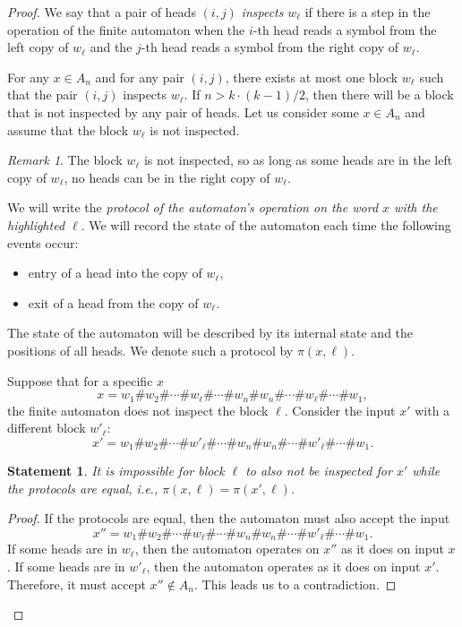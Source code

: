 \documentclass[12pt,sans]{article}
\theoremstyle{definition}
\theoremstyle{plain}
\newtheorem{statement}{Statement}[section]
\theoremstyle{remark}
\newtheorem{remark}{Remark}[section]
\begin{document}
\begin{proof}
    We say that a pair of heads $(i,j)$ \emph{inspects} $w_\ell$ if there is a step in the operation of the finite automaton when the $i$-th head reads a symbol from the left copy of $w_\ell$ and the $j$-th head reads a symbol from the right copy of $w_\ell$.

    For any $x \in A_n$ and for any pair $(i,j)$, there exists at most one block $w_\ell$ such that the pair $(i,j)$ inspects $w_\ell$. If $n > k \cdot (k-1)/2$, then there will be a block that is not inspected by any pair of heads. Let us consider some $x \in A_n$ and assume that the block $w_\ell$ is not inspected.

    \begin{remark}
        The block $w_\ell$ is not inspected, so as long as some heads are in the left copy of $w_\ell$, no heads can be in the right copy of $w_\ell$.
    \end{remark}

    We will write the \emph{protocol of the automaton's operation on the word $x$ with the highlighted $\ell$}. We will record the state of the automaton each time the following events occur:
    \begin{itemize}
        \item entry of a head into the copy of $w_\ell$,
        \item exit of a head from the copy of $w_\ell$.
    \end{itemize}
    The state of the automaton will be described by its internal state and the positions of all heads. We denote such a protocol by $\pi(x,\ell)$.

    Suppose that for a specific $x$
    \[
    x = w_1\#w_2\#\dotsb\#w_\ell\#\dotsb\#w_n\#w_n\#\dotsb\#w_\ell\#\dotsb\#w_1,
    \]
    the finite automaton does not inspect the block $\ell$. Consider the input $x'$ with a different block $w'_\ell$:
    \[
    x' = w_1\#w_2\#\dotsb\#w'_\ell\#\dotsb\#w_n\#w_n\#\dotsb\#w'_\ell\#\dotsb\#w_1.
    \]

    \begin{statement}
        It is impossible for block $\ell$ to also not be inspected for $x'$ while the protocols are equal, i.e., $\pi(x,\ell) = \pi(x',\ell)$.
    \end{statement}

    \begin{proof}
        If the protocols are equal, then the automaton must also accept the input
        \[
        x'' = w_1\#w_2\#\dotsb\#w_\ell\#\dotsb\#w_n\#w_n\#\dotsb\#w'_\ell\#\dotsb\#w_1.
        \]
        If some heads are in $w_\ell$, then the automaton operates on $x''$ as it does on input $x$. If some heads are in $w'_\ell$, then the automaton operates as it does on input $x'$. Therefore, it must accept $x'' \not\in A_n$. This leads us to a contradiction.
    \end{proof}


\end{proof}
\end{document}
